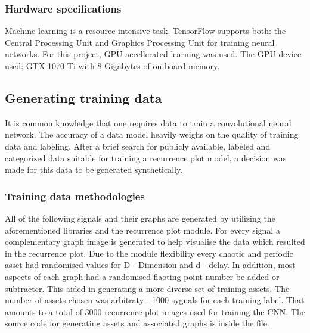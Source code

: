 \documentclass[a4paper,12pt,fleqn]{article}
\begin{document}
\subsubsection{Hardware specifications}
\label{sec:hardware}
Machine learning is a resource intensive task.
TensorFlow supports both: the Central Processing Unit and Graphics Processing Unit for training neural networks.
For this project, GPU accellerated learning was used. 
The GPU device used: GTX 1070 Ti with 8 Gigabytes of on-board memory. 


\subsection{Generating training data}
It is common knowledge that one requires data to train a convolutional neural network.
The accuracy of a data model heavily weighs on the quality of training data and labeling.
After a brief search for publicly available, labeled and categorized data suitable for training a recurrence plot model, a decision was made for this data to be generated synthetically.


\subsubsection{Training data methodologies}
All of the following signals and their graphs are generated by utilizing
the aforementioned libraries and the recurrence plot module.
For every signal a complementary graph image is generated to help visualise the data which resulted in the recurrence plot.
Due to the module flexibility every chaotic and periodic asset had randomised values for D - Dimension and d - delay.
In addition, most aspects of each graph had a randomised flaoting point number be added or subtracter.
This aided in generating a more diverse set of training assets.
The number of assets chosen was arbitraty - 1000 sygnals for each training label.
That amounts to a total of 3000 recurrence plot images used for training the CNN.
The source code for generating assets and associated graphs is inside the  file.


\end{document}
